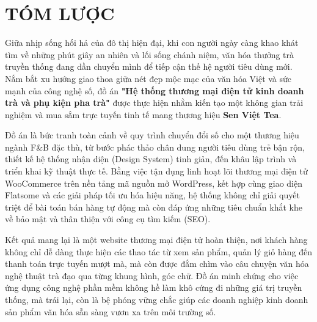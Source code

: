 \chapter*{TÓM LƯỢC}

Giữa nhịp sống hối hả của đô thị hiện đại, khi con người ngày càng khao khát tìm về những phút giây an nhiên và lối sống chánh niệm, văn hóa thưởng trà truyền thống đang dần chuyển mình để tiếp cận thế hệ người tiêu dùng mới. Nắm bắt xu hướng giao thoa giữa nét đẹp mộc mạc của văn hóa Việt và sức mạnh của công nghệ số, đồ án \textbf{"Hệ thống thương mại điện tử kinh doanh trà và phụ kiện pha trà"} được thực hiện nhằm kiến tạo một không gian trải nghiệm và mua sắm trực tuyến tinh tế mang thương hiệu \textbf{Sen Việt Tea}.

Đồ án là bức tranh toàn cảnh về quy trình chuyển đổi số cho một thương hiệu ngành F\&B đặc thù, từ bước phác thảo chân dung người tiêu dùng trẻ bận rộn, thiết kế hệ thống nhận diện (Design System) tinh giản, đến khâu lập trình và triển khai kỹ thuật thực tế. Bằng việc tận dụng linh hoạt lõi thương mại điện tử WooCommerce trên nền tảng mã nguồn mở WordPress, kết hợp cùng giao diện Flatsome và các giải pháp tối ưu hóa hiệu năng, hệ thống không chỉ giải quyết triệt để bài toán bán hàng tự động mà còn đáp ứng những tiêu chuẩn khắt khe về bảo mật và thân thiện với công cụ tìm kiếm (SEO).

Kết quả mang lại là một website thương mại điện tử hoàn thiện, nơi khách hàng không chỉ dễ dàng thực hiện các thao tác từ xem sản phẩm, quản lý giỏ hàng đến thanh toán trực tuyến mượt mà, mà còn được đắm chìm vào câu chuyện văn hóa nghệ thuật trà đạo qua từng khung hình, góc chữ. Đồ án minh chứng cho việc ứng dụng công nghệ phần mềm không hề làm khô cứng đi những giá trị truyền thống, mà trái lại, còn là bệ phóng vững chắc giúp các doanh nghiệp kinh doanh sản phẩm văn hóa sẵn sàng vươn xa trên môi trường số.
